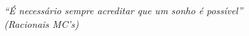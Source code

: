 \begin{epigrafe}
    \vspace*{\fill}
	\begin{flushright}
		\textit{
            ``É necessário sempre acreditar que um sonho é possível''\\ %
		    (Racionais MC's) %
		}
	\end{flushright}
\end{epigrafe}